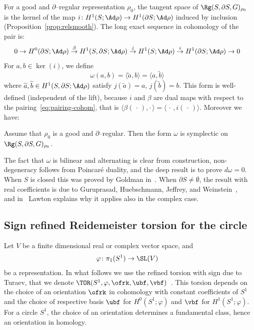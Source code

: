 For a good and $\partial$--regular representation $\rho_0$, the tangent space of $\Rg(S,\partial S,G)_{\rho_0}$ is the kernel of the map $i\colon H^1(S;\Ad\rho) \to H^1(\partial S;\Ad\rho)$ induced by inclusion (Proposition~\ref{prop:relsmooth}). The long exact sequence in cohomology of the pair is:
\begin{equation*}
0\to {H^0(\partial S;\Ad\rho)}\overset\beta\to {H^1(S,\partial S;\Ad\rho)}
\overset j\to {H^1(S;\Ad\rho)}\overset i\to {H^1(\partial S;\Ad\rho)}
\to 0
\end{equation*}
For $a,b\in \ker(i)$, we define
\begin{equation}\label{eqn:omega}
\omega(a,b)= \langle \widetilde a,b \rangle = \langle a, \widetilde b \rangle
\end{equation}
where $\widetilde a, \widetilde b\in H^1(S,\partial S;\Ad\rho) $ satisfy $j(\widetilde a)=a$, $j(\widetilde b)=b$. This form is well-defined (independent of the lift), because $i$ and $\beta$ are dual maps with respect to the pairing~\eqref{eq:pairing-cohom}, that is $\langle \beta({\,\cdot\,}),\cdot\,\rangle= \langle \,\cdot\,, i({\,\cdot\,})\rangle$. Moreover we have:


\begin{theo}
Assume that $\rho_0$ is a good and $\partial$--regular. Then the form $\omega$ is symplectic on $\Rg(S,\partial S,G)_{\rho_0}$.
\end{theo}

The fact that $\omega$ is bilinear and alternating is clear from construction, non-degen\-eracy follows from Poincaré duality, and the deep result is to prove $d\omega=0$. When $S$ is closed this was proved by Goldman in~\cite{GoldmanAdvances}. When $\partial S\neq\emptyset$, the result with real coefficients is due to Guruprasad, Huebschmann, Jeffrey, and Weinstein~\cite{GHJW}, and in~\cite{LawtonP} Lawton explains why it applies also in the complex case.



\subsection{Sign refined Reidemeister torsion for the circle}\label{sec:sgn_ref_tor}

Let $V$ be a finite dimensional real or complex vector space, and
\[
\varphi\colon\pi_1(S^1)\to \SL(V)
\]
be a representation. In what follows we use the refined torsion with sign due to Turaev, that we denote $\TOR(S^1,\varphi,\ofrk,\ubf,\vbf)$~\cite[Section~3]{TuraevKnotTheory}. This torsion depends on the choice of an orientation $\ofrk$ in cohomology with constant coefficients of $S^1$ and the choice of respective basis $\ubf$ for $H^0(S^1;\varphi)$ and $\vbf$ for $H^1(S^1;\varphi)$. For a circle $S^1$, the choice of an orientation determines a fundamental class, hence an orientation in homology.

